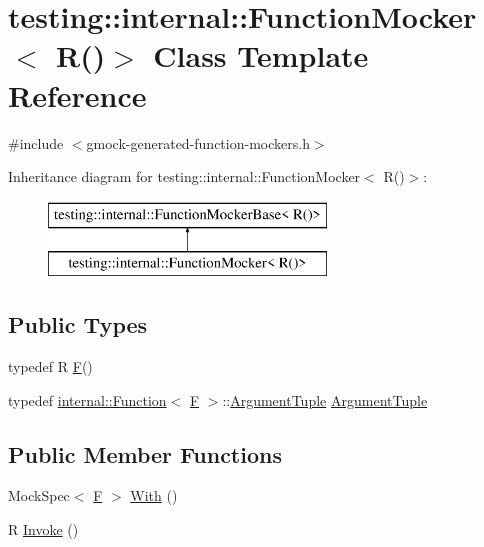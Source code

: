 \hypertarget{classtesting_1_1internal_1_1_function_mocker_3_01_r_07_08_4}{}\section{testing\+::internal\+::Function\+Mocker$<$ R()$>$ Class Template Reference}
\label{classtesting_1_1internal_1_1_function_mocker_3_01_r_07_08_4}


{\ttfamily \#include $<$gmock-\/generated-\/function-\/mockers.\+h$>$}

Inheritance diagram for testing\+::internal\+::Function\+Mocker$<$ R()$>$\+:\begin{figure}[H]
\begin{center}
\leavevmode
\includegraphics[height=2.000000cm]{d9/d87/classtesting_1_1internal_1_1_function_mocker_3_01_r_07_08_4}
\end{center}
\end{figure}
\subsection*{Public Types}
\begin{DoxyCompactItemize}
\item 
typedef R \mbox{\hyperlink{classtesting_1_1internal_1_1_function_mocker_3_01_r_07_08_4_a2c1d7da413176d87405227df90a95521}{F}}()
\item 
typedef \mbox{\hyperlink{structtesting_1_1internal_1_1_function}{internal\+::\+Function}}$<$ \mbox{\hyperlink{classtesting_1_1internal_1_1_function_mocker_3_01_r_07_08_4_a2c1d7da413176d87405227df90a95521}{F}} $>$\+::\mbox{\hyperlink{classtesting_1_1internal_1_1_function_mocker_3_01_r_07_08_4_a5a279e0d8414bf0809405c06a0725b66}{Argument\+Tuple}} \mbox{\hyperlink{classtesting_1_1internal_1_1_function_mocker_3_01_r_07_08_4_a5a279e0d8414bf0809405c06a0725b66}{Argument\+Tuple}}
\end{DoxyCompactItemize}
\subsection*{Public Member Functions}
\begin{DoxyCompactItemize}
\item 
Mock\+Spec$<$ \mbox{\hyperlink{classtesting_1_1internal_1_1_function_mocker_3_01_r_07_08_4_a2c1d7da413176d87405227df90a95521}{F}} $>$ \mbox{\hyperlink{classtesting_1_1internal_1_1_function_mocker_3_01_r_07_08_4_a4bd0ee604f6917fcfe8aae52a1f47cf3}{With}} ()
\item 
R \mbox{\hyperlink{classtesting_1_1internal_1_1_function_mocker_3_01_r_07_08_4_a8096a10aea2ffc6a78d0437855d2ef10}{Invoke}} ()
\end{DoxyCompactItemize}


